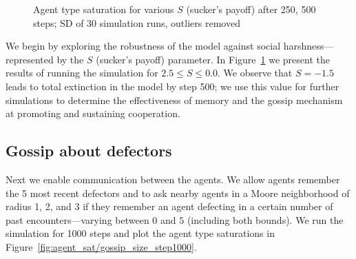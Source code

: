 \documentclass[runningheads]{llncs}
\begin{document}
\begin{figure}[!ht]
  \centering
  \caption{Agent type saturation for various $S$ (sucker's payoff) after 250, 500 steps; SD of 30 simulation runs, outliers removed}
  \label{fig:agent_sat/S-memory0gossip0}
\end{figure}

We begin by exploring the robustness of the model against social harshness---represented by the $S$ (sucker's payoff) parameter.
In Figure~\ref{fig:agent_sat/S-memory0gossip0} we present the results of running the simulation for $2.5 \leq S \leq 0.0$.
We observe that $S = -1.5$ leads to total extinction in the model by step 500;
we use this value for further simulations to determine the effectiveness of memory and the gossip mechanism at promoting and sustaining cooperation.

\subsection{Gossip about defectors}
Next we enable communication between the agents.
We allow agents remember the 5 most recent defectors and to ask nearby agents in a Moore neighborhood of radius 1, 2, and 3 if they remember an agent defecting in a certain number of past encounters---varying between $0$ and $5$ (including both bounds).
We run the simulation for 1000 steps and plot the agent type saturations in Figure~\ref{fig:agent_sat/gossip_size_step1000}.
\end{document}
